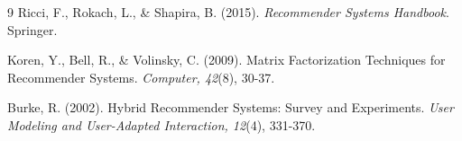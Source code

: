 \documentclass[12pt,a4paper]{report}
\begin{document}
\begin{thebibliography}{9}
Ricci, F., Rokach, L., \& Shapira, B. (2015). 
\textit{Recommender Systems Handbook}. Springer.

Koren, Y., Bell, R., \& Volinsky, C. (2009). 
Matrix Factorization Techniques for Recommender Systems. \textit{Computer, 42}(8), 30-37.

Burke, R. (2002). 
Hybrid Recommender Systems: Survey and Experiments. \textit{User Modeling and User-Adapted Interaction, 12}(4), 331-370.
\end{thebibliography}
\end{document}
